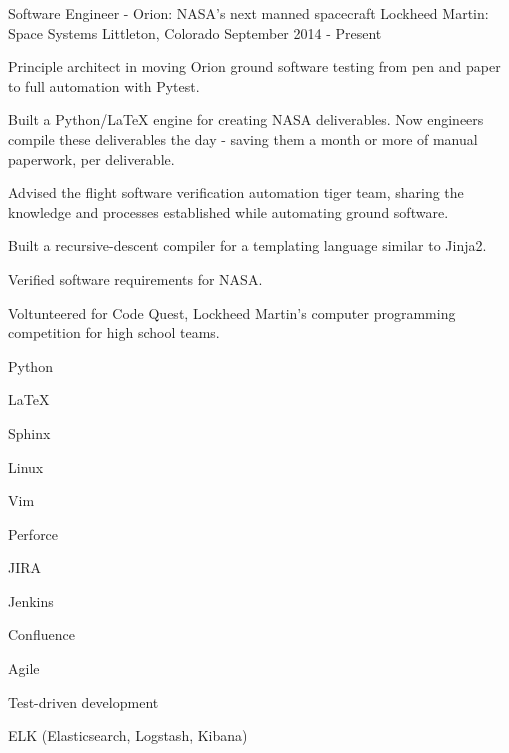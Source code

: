 \begin{cventries}
  \cventry
    {Software Engineer - Orion: NASA's next manned spacecraft} %
    {Lockheed Martin: Space Systems} %
    {Littleton, Colorado} %
    {September 2014 - Present} %
    {%
      \begin{cvitems} %
        \item {Principle architect in moving Orion ground software testing from pen and paper to full automation with Pytest.}
        \item {Built a Python/LaTeX engine for creating NASA deliverables.  Now engineers compile these deliverables the day - saving them a month or more of manual paperwork, per deliverable.}
        \item {Advised the flight software verification automation tiger team, sharing the knowledge and processes established while automating ground software.}
        \item {Built a recursive-descent compiler for a templating language similar to Jinja2.}
        \item {Verified software requirements for NASA.}
        \item {Voltunteered for Code Quest, Lockheed Martin's computer programming competition for high school teams.}
      \end{cvitems}
    }
    \begin{cventryskills}
      \item Python
      \item LaTeX
      \item Sphinx
      \item Linux
      \item Vim
      \item Perforce
      \item JIRA
      \item Jenkins
      \item Confluence
      \item Agile
      \item Test-driven development
      \item ELK (Elasticsearch, Logstash, Kibana)
    \end{cventryskills}


\end{cventries}
